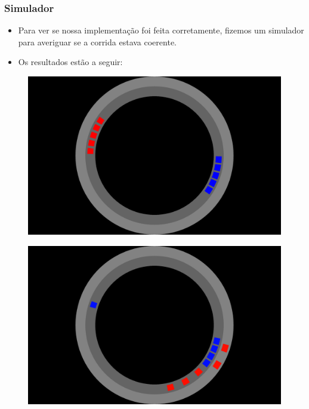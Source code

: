 \documentclass{beamer}
\begin{document}
\begin{frame}
	\frametitle{Simulador}
	\begin{itemize}
		\item Para ver se nossa implementação foi feita corretamente, fizemos um simulador para averiguar se a corrida estava coerente. 
		\item Os resultados estão a seguir:
	\end{itemize}
\end{frame}

\begin{frame}
	\begin{figure}[!h]
		\centering
		\includegraphics[scale=0.2]{10.png}
	\end{figure}
\end{frame}

\begin{frame}
	\begin{figure}[!h]
		\centering
		\includegraphics[scale=0.2]{11.png}
	\end{figure}
\end{frame}
\end{document}
